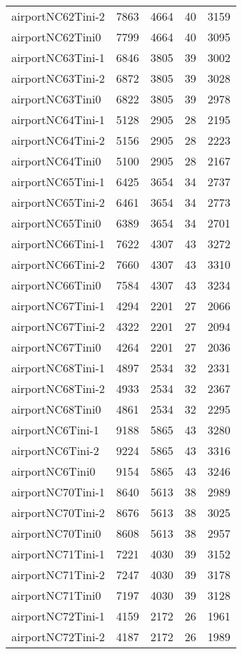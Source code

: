 \begin{longtable}{lrrrr}
airportNC62Tini-2 & 7863 & 4664 & 40 & 3159 \\
airportNC62Tini0 & 7799 & 4664 & 40 & 3095 \\
airportNC63Tini-1 & 6846 & 3805 & 39 & 3002 \\
airportNC63Tini-2 & 6872 & 3805 & 39 & 3028 \\
airportNC63Tini0 & 6822 & 3805 & 39 & 2978 \\
airportNC64Tini-1 & 5128 & 2905 & 28 & 2195 \\
airportNC64Tini-2 & 5156 & 2905 & 28 & 2223 \\
airportNC64Tini0 & 5100 & 2905 & 28 & 2167 \\
airportNC65Tini-1 & 6425 & 3654 & 34 & 2737 \\
airportNC65Tini-2 & 6461 & 3654 & 34 & 2773 \\
airportNC65Tini0 & 6389 & 3654 & 34 & 2701 \\
airportNC66Tini-1 & 7622 & 4307 & 43 & 3272 \\
airportNC66Tini-2 & 7660 & 4307 & 43 & 3310 \\
airportNC66Tini0 & 7584 & 4307 & 43 & 3234 \\
airportNC67Tini-1 & 4294 & 2201 & 27 & 2066 \\
airportNC67Tini-2 & 4322 & 2201 & 27 & 2094 \\
airportNC67Tini0 & 4264 & 2201 & 27 & 2036 \\
airportNC68Tini-1 & 4897 & 2534 & 32 & 2331 \\
airportNC68Tini-2 & 4933 & 2534 & 32 & 2367 \\
airportNC68Tini0 & 4861 & 2534 & 32 & 2295 \\
airportNC6Tini-1 & 9188 & 5865 & 43 & 3280 \\
airportNC6Tini-2 & 9224 & 5865 & 43 & 3316 \\
airportNC6Tini0 & 9154 & 5865 & 43 & 3246 \\
airportNC70Tini-1 & 8640 & 5613 & 38 & 2989 \\
airportNC70Tini-2 & 8676 & 5613 & 38 & 3025 \\
airportNC70Tini0 & 8608 & 5613 & 38 & 2957 \\
airportNC71Tini-1 & 7221 & 4030 & 39 & 3152 \\
airportNC71Tini-2 & 7247 & 4030 & 39 & 3178 \\
airportNC71Tini0 & 7197 & 4030 & 39 & 3128 \\
airportNC72Tini-1 & 4159 & 2172 & 26 & 1961 \\
airportNC72Tini-2 & 4187 & 2172 & 26 & 1989 \\

\end{longtable}
